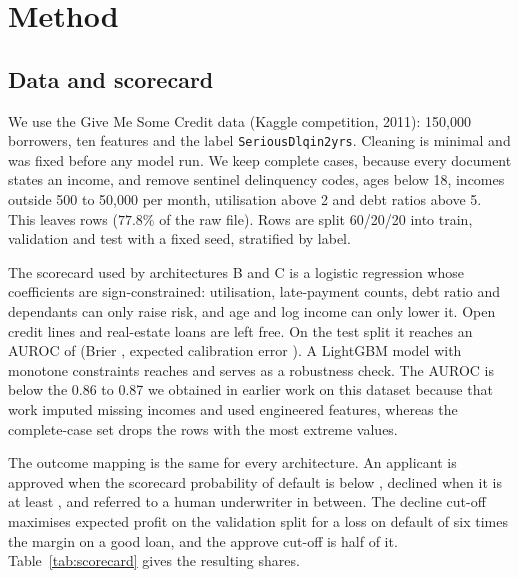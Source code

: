 \section{Method}
\label{sec:method}

\subsection{Data and scorecard}

We use the Give Me Some Credit data (Kaggle competition, 2011): 150{,}000 borrowers, ten features and the label \texttt{SeriousDlqin2yrs}. Cleaning is minimal and was fixed before any model run. We keep complete cases, because every document states an income, and remove sentinel delinquency codes, ages below 18, incomes outside 500 to 50{,}000 per month, utilisation above 2 and debt ratios above 5. This leaves \nCleanRows{} rows ($77.8\%$ of the raw file). Rows are split 60/20/20 into train, validation and test with a fixed seed, stratified by label.

The scorecard used by architectures B and C is a logistic regression whose coefficients are sign-constrained: utilisation, late-payment counts, debt ratio and dependants can only raise risk, and age and log income can only lower it. Open credit lines and real-estate loans are left free. On the test split it reaches an AUROC of \aurocScoreLR{} (Brier \brierScoreLR{}, expected calibration error \eceScoreLR{}). A LightGBM model with monotone constraints reaches \aurocScoreLGBM{} and serves as a robustness check. The AUROC is below the 0.86 to 0.87 we obtained in earlier work on this dataset because that work imputed missing incomes and used engineered features, whereas the complete-case set drops the rows with the most extreme values.

The outcome mapping is the same for every architecture. An applicant is approved when the scorecard probability of default is below \thApprove{}, declined when it is at least \thDecline{}, and referred to a human underwriter in between. The decline cut-off maximises expected profit on the validation split for a loss on default of six times the margin on a good loan, and the approve cut-off is half of it. Table~\ref{tab:scorecard} gives the resulting shares.

\begin{table}[tbp]
\centering\small
\caption{Scorecards on the test split. Outcome shares come from the mapping above.}
\label{tab:scorecard}

\end{table}

